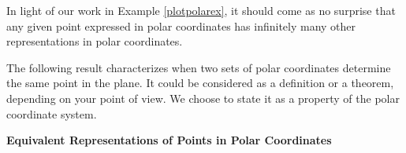 \documentclass{ximera}
\begin{document}
\begin{example}
\begin{explanation}
\begin{enumerate}
\begin{image}
\end{image}
\end{enumerate}
\end{explanation}

\end{example}


In light of our work in Example \ref{plotpolarex}, it should come as no surprise that any given point expressed in polar coordinates has infinitely many other representations in polar coordinates.  

 

The following result characterizes when two sets of polar coordinates determine the same point in the plane.  It could be considered as a definition or a theorem, depending on your point of view.    We choose to state it as a property of the polar coordinate system.

 

\centerline{\textbf{Equivalent Representations of Points in Polar Coordinates}} 

 
\end{document}
